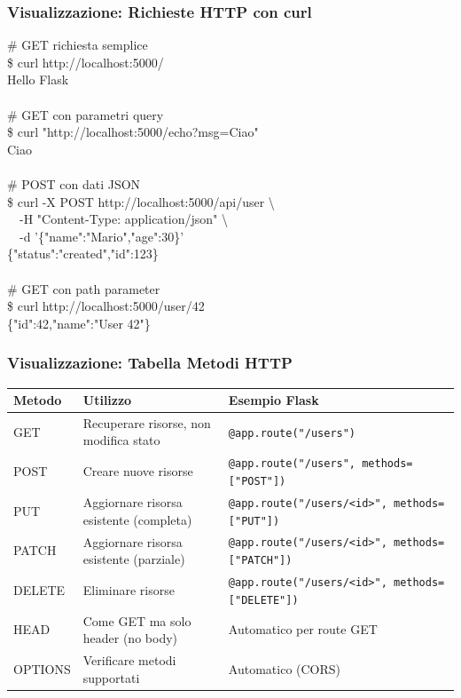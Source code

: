 \subsubsection{Visualizzazione: Richieste HTTP con curl}
\begin{tcolorbox}[title=Output Terminale: Richieste curl, colback=black, coltext=green!80, fontupper=\ttfamily\small]
\# GET richiesta semplice\\
\$ curl http://localhost:5000/\\
Hello Flask\\
\\
\# GET con parametri query\\
\$ curl "http://localhost:5000/echo?msg=Ciao"\\
Ciao\\
\\
\# POST con dati JSON\\
\$ curl -X POST http://localhost:5000/api/user \textbackslash\\
\ \ -H "Content-Type: application/json" \textbackslash\\
\ \ -d '\{"name":"Mario","age":30\}'\\
\{"status":"created","id":123\}\\
\\
\# GET con path parameter\\
\$ curl http://localhost:5000/user/42\\
\{"id":42,"name":"User 42"\}
\end{tcolorbox}

\subsubsection{Visualizzazione: Tabella Metodi HTTP}
\begin{center}
\begin{tabular}{|l|p{6cm}|p{4cm}|}
\hline
\textbf{Metodo} & \textbf{Utilizzo} & \textbf{Esempio Flask} \\
\hline
GET & Recuperare risorse, non modifica stato & \texttt{@app.route("/users")} \\
\hline
POST & Creare nuove risorse & \texttt{@app.route("/users", methods=["POST"])} \\
\hline
PUT & Aggiornare risorsa esistente (completa) & \texttt{@app.route("/users/<id>", methods=["PUT"])} \\
\hline
PATCH & Aggiornare risorsa esistente (parziale) & \texttt{@app.route("/users/<id>", methods=["PATCH"])} \\
\hline
DELETE & Eliminare risorse & \texttt{@app.route("/users/<id>", methods=["DELETE"])} \\
\hline
HEAD & Come GET ma solo header (no body) & Automatico per route GET \\
\hline
OPTIONS & Verificare metodi supportati & Automatico (CORS) \\
\hline
\end{tabular}
\end{center}


